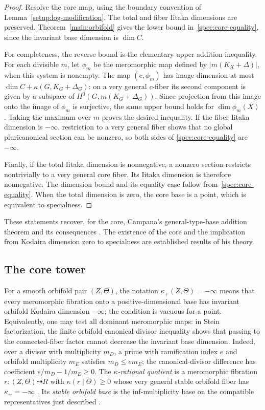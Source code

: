 \begin{proof}
Resolve the core map, using the boundary convention of
Lemma~\ref{setup:log-modification}.  The total and fiber Iitaka
dimensions are preserved.  Theorem~\ref{main:orbifold} gives
the lower bound in~\eqref{spec:core-equality}, since the invariant
base dimension is $\dim C$.

For completeness, the reverse bound is the elementary upper
addition inequality.  For each divisible $m$, let $\phi_m$ be
the meromorphic map defined by $|m(K_X+\Delta)|$, when this
system is nonempty.  The map $(c,\phi_m)$ has image dimension
at most $\dim C+\kappa(G,K_G+\Delta_G)$: on a very general
$c$-fiber its second component is given by a subspace of
$H^0(G,m(K_G+\Delta_G))$.  Since projection from this image
onto the image of $\phi_m$ is surjective, the same upper bound
holds for $\dim\phi_m(X)$.  Taking the maximum over $m$ proves
the desired inequality.  If the fiber Iitaka dimension is
$-\infty$, restriction to a very general fiber shows that no
global pluricanonical section can be nonzero, so both sides of
\eqref{spec:core-equality} are $-\infty$.

Finally, if the total Iitaka dimension is nonnegative, a nonzero
section restricts nontrivially to a very general core fiber.
Its Iitaka dimension is therefore nonnegative.  The dimension
bound and its equality case follow from~\eqref{spec:core-equality}.
When the total dimension is zero, the core base is a point,
which is equivalent to specialness.
\end{proof}

These statements recover, for the core, Campana's general-type-base addition
theorem and its consequences
\cite[Theorems~6.3, 6.7, and~6.8]{CampanaOrbifolds}.
The existence of the core and the implication from Kodaira
dimension zero to specialness are established results of his
theory.

\subsection{The core tower}
\label{spec:core-tower-section}

For a smooth orbifold pair $(Z,\Theta)$, the notation
$\kappa_+(Z,\Theta)=-\infty$ means that every meromorphic
fibration onto a positive-dimensional base has invariant
orbifold Kodaira dimension $-\infty$; the condition is vacuous
for a point.  Equivalently, one may test all dominant meromorphic
maps: in Stein factorization, the finite orbifold canonical-divisor
inequality shows that passing to the connected-fiber factor cannot
decrease the invariant base dimension.  Indeed, over a divisor
with multiplicity $m_D$, a prime with ramification index $e$ and
orbifold multiplicity $m_E$ satisfies $m_D\leq e m_E$; the
canonical-divisor difference has coefficient
$e/m_D-1/m_E\geq0$.
The \emph{$\kappa$-rational quotient} is a meromorphic fibration
$r:(Z,\Theta)\dashrightarrow R$ with $\kappa(r\mid\Theta)\geq0$
whose very general stable orbifold fiber has $\kappa_+=-\infty$
\cite[Definition~5.23 and Corollary~6.14]{CampanaOrbifolds}.
Its \emph{stable orbifold base} is the inf-multiplicity base on the
compatible representatives just described
\cite[Proposition~3.15, Corollary~4.14, and \S7.1]{CampanaOrbifolds}.

